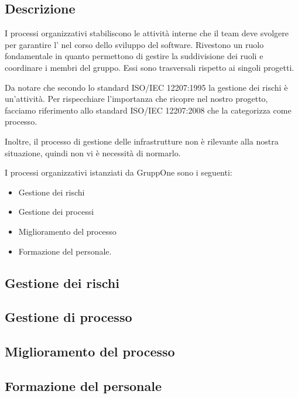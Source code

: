 \documentclass[../norme-di-progetto.tex]{subfiles}
\begin{document}
\subsection{Descrizione}%
\label{sub:processi_organizzativi/descrizione}

I processi organizzativi stabiliscono le attività interne che il team deve svolgere per garantire l' nel corso dello sviluppo del software.
Rivestono un ruolo fondamentale in quanto permettono di gestire la suddivisione dei ruoli e coordinare i membri del gruppo.
Essi sono trasversali rispetto ai singoli progetti.

Da notare che secondo lo standard ISO/IEC 12207:1995 la gestione dei rischi è un'attività.
Per rispecchiare l'importanza che ricopre nel nostro progetto, facciamo riferimento allo standard ISO/IEC 12207:2008 che la categorizza come processo.

Inoltre, il processo di gestione delle infrastrutture non è rilevante alla nostra situazione, quindi non vi è necessità di normarlo.

I processi organizzativi istanziati da GruppOne sono i seguenti:

\begin{itemize}
  \item Gestione dei rischi
  \item Gestione dei processi
  \item Miglioramento del processo
  \item Formazione del personale.
\end{itemize}

\subsection{Gestione dei rischi}%
\label{sub:gestione_dei_rischi}



\subsection{Gestione di processo}%
\label{sub:gestione_di_processo}



\subsection{Miglioramento del processo}%
\label{sub:miglioramento_del_processo}



\subsection{Formazione del personale}%
\label{sub:formazione_del_personale}


\end{document}
